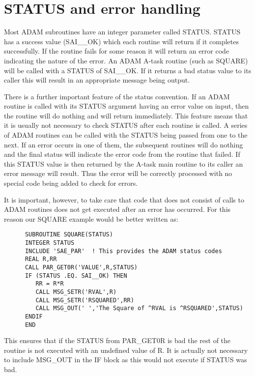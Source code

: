 \documentclass[twoside,11pt]{report}
\newcommand{\xlabel}[1]{}
\begin{document}
\section{\xlabel{status_and_error_handling}STATUS and error handling}

Most ADAM subroutines have an integer parameter called STATUS. STATUS has a
success value (SAI\_\_OK) which each routine will return if it completes
successfully. If the routine fails for some reason it will return an error code
indicating the nature of the error. An ADAM A-task routine (such as SQUARE)
will be called with a STATUS of SAI\_\_OK. If it returns a bad status value to
its caller this will result in an appropriate message being output.

There is a further important feature of the status convention. If an
ADAM routine is called with its STATUS argument having an error value
on input, then the routine will do nothing and will return immediately.
This feature means that it is usually not necessary to check STATUS
after each routine is called. A series of ADAM routines can be called
with the STATUS being passed from one to the next. If an error occurs in
one of them, the subsequent routines will do nothing and the final status
will indicate the error code from the routine that failed. If this STATUS
value is then returned by the A-task main routine to its caller an error
message will result. Thus the error will be correctly processed with no
special code being added to check for errors.

It is important, however, to take care that code that does not consist of
calls to ADAM routines does not get executed after an error has occurred.
For this reason our SQUARE example would be better written as:

\begin{verbatim}
      SUBROUTINE SQUARE(STATUS)
      INTEGER STATUS
      INCLUDE 'SAE_PAR'  ! This provides the ADAM status codes
      REAL R,RR
      CALL PAR_GET0R('VALUE',R,STATUS)
      IF (STATUS .EQ. SAI__OK) THEN
         RR = R*R
         CALL MSG_SETR('RVAL',R)
         CALL MSG_SETR('RSQUARED',RR)
         CALL MSG_OUT(' ','The Square of ^RVAL is ^RSQUARED',STATUS)
      ENDIF
      END
\end{verbatim}

This ensures that if the STATUS from PAR\_GET0R is bad the rest of the routine
is not executed with an undefined value of R. It is actually not necessary
to include MSG\_OUT in the IF block as this would not execute if STATUS was
bad.
\end{document}
